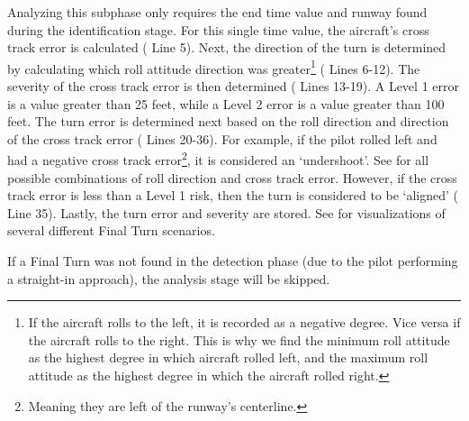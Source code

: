             Analyzing this subphase only requires the end time value and runway found during the identification stage.  For this single time value, the aircraft's cross track error is calculated ( Line 5).  Next, the direction of the turn is determined by calculating which roll attitude direction was greater\footnote{If the aircraft rolls to the left, it is recorded as a negative degree.  Vice versa if the aircraft rolls to the right.  This is why we find the minimum roll attitude as the highest degree in which aircraft rolled left, and the maximum roll attitude as the highest degree in which the aircraft rolled right.} ( Lines 6-12).  The severity of the cross track error is then determined ( Lines 13-19).  A Level 1 error is a value greater than 25 feet, while a Level 2 error is a value greater than 100 feet.  The turn error is determined next based on the roll direction and direction of the cross track error ( Lines 20-36).  For example, if the pilot rolled left and had a negative cross track error\footnote{Meaning they are left of the runway's centerline.}, it is considered an `undershoot'.  See  for all possible combinations of roll direction and cross track error.  However, if the cross track error is less than a Level 1 risk, then the turn is considered to be `aligned' ( Line 35).  Lastly, the turn error and severity are stored.  See  for visualizations of several different Final Turn scenarios.
            
            If a Final Turn was not found in the detection phase (due to the pilot performing a straight-in approach), the analysis stage will be skipped.
            
